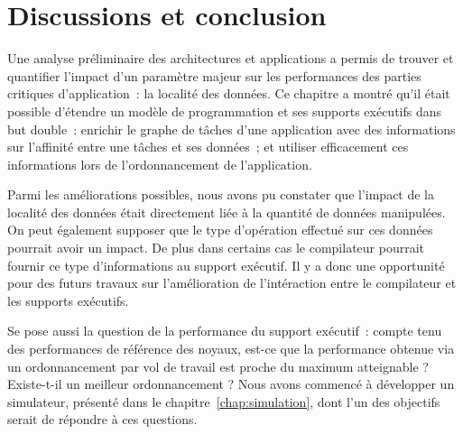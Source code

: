 \section*{Discussions et conclusion}

Une analyse préliminaire des architectures et applications a permis de trouver et quantifier l'impact d'un paramètre majeur sur les performances des parties critiques d'application~: la localité des données.
Ce chapitre a montré qu'il était possible d'étendre un modèle de programmation et ses supports exécutifs dans but double~: enrichir le graphe de tâches d'une application avec des informations sur l'affinité entre une tâches et ses données~; et utiliser efficacement ces informations lors de l'ordonnancement de l'application.

Parmi les améliorations possibles, nous avons pu constater que l'impact de la localité des données était directement liée à la quantité de données manipulées.
On peut également supposer que le type d'opération effectué sur ces données pourrait avoir un impact.
De plus dans certains cas le compilateur pourrait fournir ce type d'informations au support exécutif.
Il y a donc une opportunité pour des futurs travaux sur l'amélioration de l'intéraction entre le compilateur et les supports exécutifs.

Se pose aussi la question de la performance du support exécutif~: compte tenu des performances de référence des noyaux, est-ce que la performance obtenue via un ordonnancement par vol de travail est proche du maximum atteignable ?
Existe-t-il un meilleur ordonnancement ?
Nous avons commencé à développer un simulateur, présenté dans le chapitre~\ref{chap:simulation}, dont l'un des objectifs serait de répondre à ces questions.
